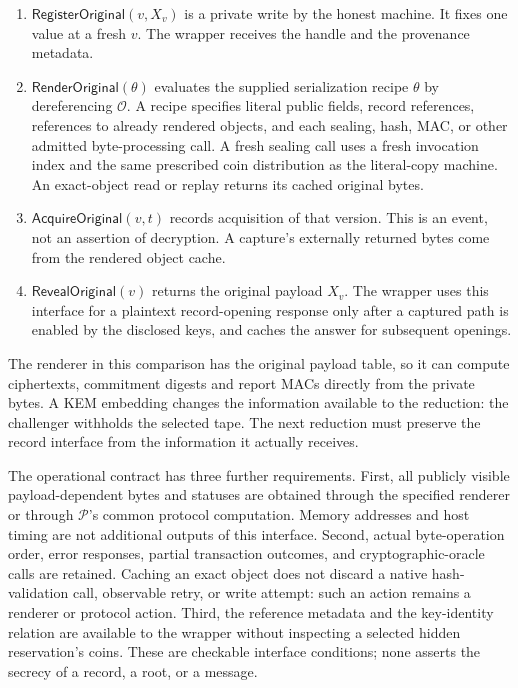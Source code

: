 \documentclass[pdflatex]{sn-jnl}
\theoremstyle{thmstyleone}
\theoremstyle{thmstylethree}
\theoremstyle{thmstyletwo}
\begin{document}
\begin{enumerate}
  \item $\mathsf{RegisterOriginal}(v,X_v)$ is a private write by the honest
  machine.  It fixes one value at a fresh $v$.  The wrapper receives the
  handle and the provenance metadata.
  \item $\mathsf{RenderOriginal}(\theta)$ evaluates the supplied serialization
  recipe $\theta$ by dereferencing $\mathcal O$.  A recipe specifies literal
  public fields, record references, references to already rendered objects,
  and each sealing, hash, MAC, or other admitted byte-processing call.
  A fresh sealing call uses a fresh invocation index and the same prescribed
  coin distribution as the literal-copy machine.  An exact-object read or
  replay returns its cached original bytes.
  \item $\mathsf{AcquireOriginal}(v,t)$ records acquisition of that version.
  This is an event, not an assertion of decryption.  A capture's externally
  returned bytes come from the rendered object cache.
  \item $\mathsf{RevealOriginal}(v)$ returns the original payload $X_v$.
  The wrapper uses this interface for a plaintext record-opening response
  only after a captured path is enabled by the disclosed keys, and caches
  the answer for subsequent openings.
\end{enumerate}

The renderer in this comparison has the original payload table, so it can
compute ciphertexts, commitment digests and report MACs directly from the
private bytes. A KEM embedding changes the information available to the
reduction: the challenger withholds the selected tape. The next reduction
must preserve the record interface from the information it actually receives.

The operational contract has three further requirements.
First, all publicly visible payload-dependent bytes and statuses are obtained
through the specified renderer or through $\mathcal P$'s common protocol
computation.  Memory addresses and host timing are not additional outputs of
this interface.
Second, actual byte-operation order, error responses, partial transaction
outcomes, and cryptographic-oracle calls are retained.  Caching an exact
object does not discard a native hash-validation call, observable retry, or
write attempt: such an action remains a renderer or protocol action.
Third, the reference metadata and the key-identity relation are available to
the wrapper without inspecting a selected hidden reservation's coins.
These are checkable interface conditions; none asserts the secrecy of a
record, a root, or a message.
\end{document}
